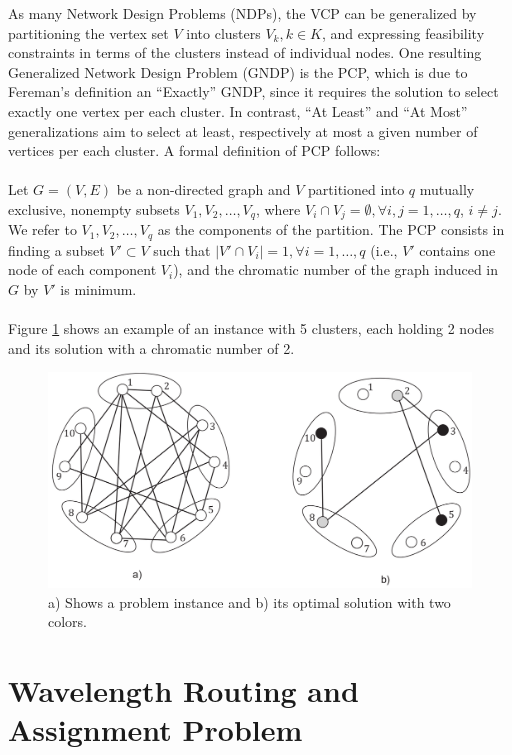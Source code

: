 As many Network Design Problems (NDPs), the VCP can be generalized by partitioning the vertex set $V$ into clusters $V_k, k \in K$, and expressing feasibility constraints in terms of the clusters instead of individual nodes. \cite{feremans-03} One resulting Generalized Network Design Problem (GNDP) is the PCP, which is due to Fereman's definition an ``Exactly'' GNDP, since it requires the solution to select exactly one vertex per each cluster. In contrast, ``At Least'' and ``At Most'' generalizations aim to select at least, respectively at most a given number of vertices per each cluster. A formal definition of PCP follows: \\\\
Let $G = (V, E)$ be a non-directed graph and $V$ partitioned into $q$ mutually exclusive, nonempty subsets $V_1, V_2,\ldots, V_q$, where $V_i \cap V_j = \emptyset, \forall i, j = 1, \ldots , q$, $i \neq j$. We refer to $V_1, V_2, \ldots , V_q$ as the components of the partition. The PCP consists in finding a subset $V' \subset V$ such that $|V' \cap V_i| = 1, \forall i = 1, \ldots , q$ (i.e., $V'$ contains one node of each component $V_i$), and the chromatic number of the graph induced in $G$ by $V'$ is minimum.\\\\
Figure \ref{pd:pcpExample} shows an example of an instance with 5 clusters, each holding 2 nodes and its solution with a chromatic number of 2.

\begin{figure}
\begin{center}
\includegraphics[scale=0.3]{figures/pcp.png}
\caption{a) Shows a problem instance and b) its optimal solution with two colors.}
\label{pd:pcpExample}
\end{center}
\end{figure}


\section{Wavelength Routing and Assignment Problem}
\label{sec:minrwa}

